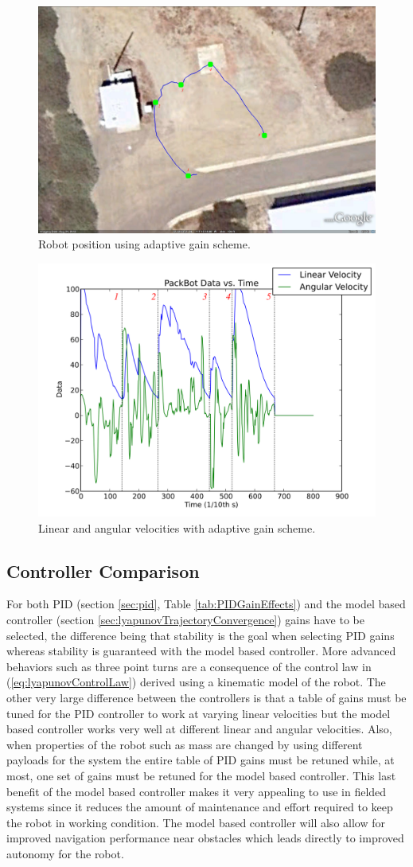 \begin{figure}[ht!]
	\centering
	\includegraphics[width=.5\textwidth]{images/20100929_1448_GE_KF_waypts}
	\caption{Robot position using adaptive gain scheme.}
	\label{fig:resultsLyapunovPositionAdaptive}
\end{figure}

\begin{figure}[ht!]
	\centering
	\includegraphics[width=.5\textwidth]{images/20100929_1448_pbtx}
	\caption{Linear and angular velocities with adaptive gain scheme.}
	\label{fig:resultsLyapunovVelocitiesAdaptive}
\end{figure}

\subsection{Controller Comparison}
\label{sec:controllerComparison}
For both PID (section \ref{sec:pid}, Table \ref{tab:PIDGainEffects}) and the model based controller (section \ref{sec:lyapunovTrajectoryConvergence}) gains have to be selected, the difference being that stability is the goal when selecting PID gains whereas stability is guaranteed with the model based controller. More advanced behaviors such as three point turns are a consequence of the control law in (\ref{eq:lyapunovControlLaw}) derived using a kinematic model of the robot. The other very large difference between the controllers is that a table of gains must be tuned for the PID controller to work at varying linear velocities but the model based controller works very well at different linear and angular velocities. Also, when properties of the robot such as mass are changed by using different payloads for the system the entire table of PID gains must be retuned while, at most, one set of gains must be retuned for the model based controller. This last benefit of the model based controller makes it very appealing to use in fielded systems since it reduces the amount of maintenance and effort required to keep the robot in working condition. The model based controller will also allow for improved navigation performance near obstacles which leads directly to improved autonomy for the robot.
